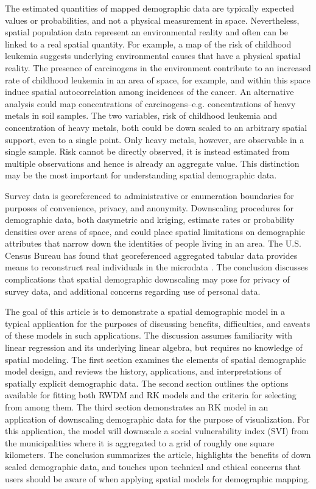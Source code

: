 \documentclass[]{interact}
\theoremstyle{plain}%
\theoremstyle{definition}
\theoremstyle{remark}
\begin{document}
The estimated quantities of mapped demographic data are typically expected values or probabilities, and not a physical measurement in space.  Nevertheless, spatial population data represent an environmental reality and often can be linked to a real spatial quantity.  For example, a map of the risk of childhood leukemia suggests underlying environmental causes that have a physical spatial reality.  The presence of carcinogens in the environment contribute to an increased rate of childhood leukemia in an area of space, for example, and within this space induce spatial autocorrelation among incidences of the cancer.  An alternative analysis could map concentrations of carcinogens--e.g. concentrations of heavy metals in soil samples.  The two variables, risk of childhood leukemia and concentration of heavy metals, both could be down scaled to an arbitrary spatial support, even to a single point.  Only heavy metals, however, are observable in a single sample.  Risk cannot be directly observed, it is instead estimated from multiple observations and hence is already an aggregate value.  This distinction may be the most important for understanding spatial demographic data.

Survey data is georeferenced to administrative or enumeration boundaries for purposes of convenience, privacy, and anonymity.  Downscaling procedures for demographic data, both dasymetric and kriging, estimate rates or probability densities over areas of space, and could place spatial limitations on demographic attributes that narrow down the identities of people living in an area.  The U.S. Census Bureau has found that georeferenced aggregated tabular data provides means to reconstruct real individuals in the microdata \citep{abowd18, abowd19}.  The conclusion discusses complications that spatial demographic downscaling may pose for privacy of survey data, and additional concerns regarding use of personal data.

The goal of this article is to demonstrate a spatial demographic model in a typical application for the purposes of discussing benefits, difficulties, and caveats of these models in such applications.  The discussion assumes familiarity with linear regression and its underlying linear algebra, but requires no knowledge of spatial modeling.  The first section examines the elements of spatial demographic model design, and reviews the history, applications, and interpretations of spatially explicit demographic data.  The second section outlines the options available for fitting both RWDM and RK models and the criteria for selecting from among them.  The third section demonstrates an RK model in an application of downscaling demographic data for the purpose of visualization.  For this application, the model will downscale a social vulnerability index (SVI) from the municipalities where it is aggregated to a grid of roughly one square kilometers.  The conclusion summarizes the article, highlights the benefits of down scaled demographic data, and touches upon technical and ethical concerns that users should be aware of when applying spatial models for demographic mapping.
\end{document}
